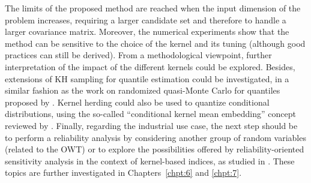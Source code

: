 The limits of the proposed method are reached when the input dimension of the problem increases, requiring a larger candidate set and therefore to handle a larger covariance matrix. 
Moreover, the numerical experiments show that the method can be sensitive to the choice of the kernel and its tuning (although good practices can still be derived). 
From a methodological viewpoint, further interpretation of the impact of the different kernels could be explored. 
Besides, extensions of KH sampling for quantile estimation could be investigated, in a similar fashion as the work on randomized quasi-Monte Carlo for quantiles proposed by \cite{tuffin_2019}. 
Kernel herding could also be used to quantize conditional distributions, using the so-called ``conditional kernel mean embedding'' concept reviewed by \cite{sullivan_2020}. 
Finally, regarding the industrial use case, the next step should be to perform a reliability analysis by considering another group of random variables (related to the OWT) or to explore the possibilities offered by reliability-oriented sensitivity analysis in the context of kernel-based indices, as studied in \citet{marrel_chabridon_2021}.
These topics are further investigated in Chapters~\ref{chpt:6} and \ref{chpt:7}.
